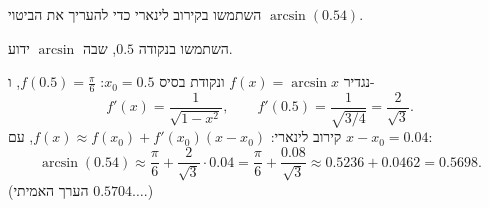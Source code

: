 
\begin{question}
השתמשו בקירוב לינארי כדי להעריך את הביטוי $\arcsin(0.54)$.
\end{question}

\begin{hint}
השתמשו בנקודה $0.5$, שבה $\arcsin$ ידוע.
\end{hint}

\begin{solution}
נגדיר $f(x)=\arcsin x$ ונקודת בסיס $x_0=0.5$: $f(0.5)=\frac{\pi}{6}$, ו-
\[ f'(x)=\frac{1}{\sqrt{1-x^2}},\qquad f'(0.5)=\frac{1}{\sqrt{3/4}}=\frac{2}{\sqrt3}. \]
קירוב לינארי: $f(x)\approx f(x_0)+f'(x_0)(x-x_0)$, עם $x-x_0=0.04$:
\[ \arcsin(0.54)\approx\frac{\pi}{6}+\frac{2}{\sqrt3}\cdot0.04=\frac{\pi}{6}+\frac{0.08}{\sqrt3}\approx 0.5236+0.0462=0.5698. \]
(הערך האמיתי $0.5704\ldots$.)
\end{solution}
